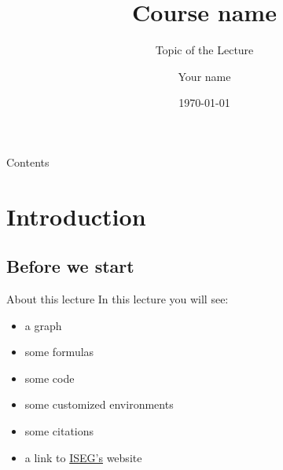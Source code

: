 


\title[Course name]{Course name}
\subtitle{Topic of the Lecture}

\author[Your name]{Your name}

\date{\today}




\begin{frame}
	\titlepage
\end{frame}

\begin{frame}{Contents}
	\tableofcontents
\end{frame}

\section{Introduction}

\subsection{Before we start}

\begin{frame}{About this lecture}
	In this lecture you will see:
	\begin{itemize}
	\item a graph
	\item some formulas
	\item some code
	\item some customized environments
	\item some citations \citep{kass1995}
	\item a link to \href{https://www.iseg.ulisboa.pt/aquila/instituicao/ISEG/}{ISEG's} website
	\end{itemize}
\end{frame}

